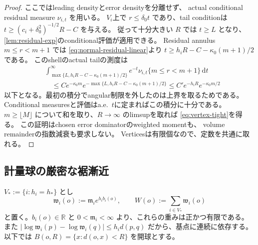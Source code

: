 \documentclass[11pt,a4paper]{ltjsarticle}
\newcommand{\RR}{\mathbb R}
\newcommand{\dd}{\mathrm d}
\theoremstyle{plain}
\theoremstyle{definition}
\theoremstyle{remark}
\begin{document}
\begin{proof}
ここではleading densityとerror densityを分離せず、
actual conditional residual measure $\nu_{i,t}$ を用いる。
$V_i$上で $r\le\delta_0t$ であり、tail conditionは
$t\ge(c_i+\delta_0^2)^{-1/2}R-C$ を与える。
従って十分大きい $R$ では $t\ge L$ となり、
\cref{lem:residual-exp}のconditional評価が適用できる。
Residual annulus $m\le r<m+1$ では
\eqref{eq:normal-residual-linear}より
$t\ge h_iR-C-\kappa_0(m+1)/2$ である。
このshellのactual tailの測度は
\[
 \begin{split}
 &\int_{\max\{L,h_iR-C-\kappa_0(m+1)/2\}}^\infty
       e^{-t}\nu_{i,t}\{m\le r<m+1\}\,\dd t\\
 &\quad\le C e^{-\kappa_0m}
    e^{-\max\{L,h_iR-C-\kappa_0(m+1)/2\}}
 \le C'e^{-h_iR}e^{-\kappa_0m/2}
 \end{split}
\]
以下となる。最初の積分でangular制限を外したのは上界を取るためである。
Conditional measuresと評価はa.e.\ $t$に定まればこの積分に十分である。
$m\ge\lfloor M\rfloor$ について和を取り、$R\to\infty$ のlimsupを取れば
\eqref{eq:vertex-tight}を得る。
この証明はchosen error dominatorのweighted momentも、
volume remainderの指数減衰も要求しない。
Verticesは有限個なので、定数を共通に取れる。
\end{proof}

\subsection{計量球の厳密な裾漸近}
$V_*:=\{i:h_i=h_*\}$ とし
\[
 \mathfrak w_i(o):=\mathfrak m_i e^{h_i b_i(o)},
 \qquad
 W(o):=\sum_{i\in V_*}\mathfrak w_i(o)
\]
と置く。$b_i(o)\in\RR$ と $0<\mathfrak m_i<\infty$ より、これらの重みは正かつ有限である。
また $|\log\mathfrak w_i(p)-\log\mathfrak w_i(q)|\le h_i d(p,q)$ だから、基点に連続に依存する。
以下では $B(o,R)=\{x:d(o,x)<R\}$ を開球とする。
\end{document}
